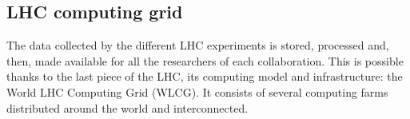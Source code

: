 \subsection{LHC computing grid}
\label{sec:Chap2:LHC:LCG}
The data collected by the different LHC experiments is stored, processed and, then, 
made available for all the researchers of each collaboration. %
This is possible thanks to the last piece of the LHC, its computing model and infrastructure: the World LHC Computing Grid (WLCG). It consists
of several computing farms distributed around the world and interconnected. 


